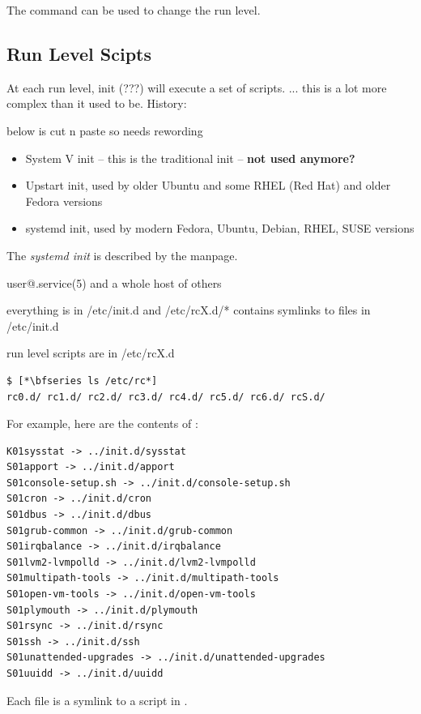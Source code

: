 \noindent
The  command can be used to change the run level.

\subsection{Run Level Scipts}

At each run level, init (???) will execute a set of scripts. ... this is a lot more complex than it used to be. History:

below is cut n paste so needs rewording

\begin{itemize}
	\item System V init -- this is the traditional init --  \textbf{not used anymore?}
	\item Upstart init, used by older Ubuntu and some RHEL (Red Hat) and older Fedora versions
	\item systemd init, used by modern Fedora, Ubuntu, Debian, RHEL, SUSE versions
\end{itemize}

\noindent
The \textit{systemd init} is described by the  manpage. 

user@.service(5) and a whole host of others

everything is in /etc/init.d and /etc/rcX.d/* contains symlinks to files in /etc/init.d

run level scripts are in /etc/rcX.d

\begin{lstlisting}
$ [*\bfseries ls /etc/rc*]
rc0.d/ rc1.d/ rc2.d/ rc3.d/ rc4.d/ rc5.d/ rc6.d/ rcS.d/ 
\end{lstlisting}

\noindent
For example, here are the contents of :

\begin{lstlisting}
K01sysstat -> ../init.d/sysstat
S01apport -> ../init.d/apport
S01console-setup.sh -> ../init.d/console-setup.sh
S01cron -> ../init.d/cron
S01dbus -> ../init.d/dbus
S01grub-common -> ../init.d/grub-common
S01irqbalance -> ../init.d/irqbalance
S01lvm2-lvmpolld -> ../init.d/lvm2-lvmpolld
S01multipath-tools -> ../init.d/multipath-tools
S01open-vm-tools -> ../init.d/open-vm-tools
S01plymouth -> ../init.d/plymouth
S01rsync -> ../init.d/rsync
S01ssh -> ../init.d/ssh
S01unattended-upgrades -> ../init.d/unattended-upgrades
S01uuidd -> ../init.d/uuidd
\end{lstlisting}

\noindent
Each file is a symlink to a script in .

